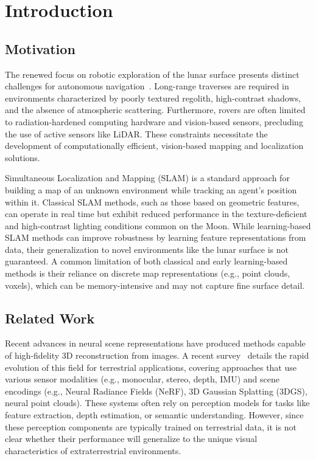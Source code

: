 \section{Introduction}

\subsection{Motivation}
The renewed focus on robotic exploration of the lunar surface presents distinct challenges for autonomous navigation~\cite{eurocons}. Long-range traverses are required in environments characterized by poorly textured regolith, high-contrast shadows, and the absence of atmospheric scattering. Furthermore, rovers are often limited to radiation-hardened computing hardware and vision-based sensors, precluding the use of active sensors like LiDAR. These constraints necessitate the development of computationally efficient, vision-based mapping and localization solutions.

Simultaneous Localization and Mapping (SLAM) is a standard approach for building a map of an unknown environment while tracking an agent's position within it. Classical SLAM methods, such as those based on geometric features, can operate in real time but exhibit reduced performance in the texture-deficient and high-contrast lighting conditions common on the Moon. While learning-based SLAM methods can improve robustness by learning feature representations from data, their generalization to novel environments like the lunar surface is not guaranteed. A common limitation of both classical and early learning-based methods is their reliance on discrete map representations (e.g., point clouds, voxels), which can be memory-intensive and may not capture fine surface detail.

\subsection{Related Work}

Recent advances in neural scene representations have produced methods capable of high-fidelity 3D reconstruction from images. A recent survey~\cite{tosi_how_2024} details the rapid evolution of this field for terrestrial applications, covering approaches that use various sensor modalities (e.g., monocular, stereo, depth, IMU) and scene encodings (e.g., Neural Radiance Fields (NeRF), 3D Gaussian Splatting (3DGS), neural point clouds). These systems often rely on perception models for tasks like feature extraction, depth estimation, or semantic understanding. However, since these perception components are typically trained on terrestrial data, it is not clear whether their performance will generalize to the unique visual characteristics of extraterrestrial environments.

